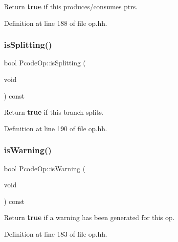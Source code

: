 Return {\bfseries{true}} if this produces/consumes ptrs. 



Definition at line 188 of file op.\+hh.

\mbox{\label{class_pcode_op_a3a3c03bf005cafa3f295251b742423b4}} 
\subsubsection{\texorpdfstring{isSplitting()}{isSplitting()}}
{\footnotesize\ttfamily bool Pcode\+Op\+::is\+Splitting (\begin{DoxyParamCaption}\item[{void}]{ }\end{DoxyParamCaption}) const\hspace{0.3cm}{\ttfamily [inline]}}



Return {\bfseries{true}} if this branch splits. 



Definition at line 190 of file op.\+hh.

\mbox{\label{class_pcode_op_a4b75c2511aca4f50dbb2a61036adb772}} 
\subsubsection{\texorpdfstring{isWarning()}{isWarning()}}
{\footnotesize\ttfamily bool Pcode\+Op\+::is\+Warning (\begin{DoxyParamCaption}\item[{void}]{ }\end{DoxyParamCaption}) const\hspace{0.3cm}{\ttfamily [inline]}}



Return {\bfseries{true}} if a warning has been generated for this op. 



Definition at line 183 of file op.\+hh.

\mbox{\label{class_pcode_op_a4a9896fa29357fad1c29a0714863a493}} 
